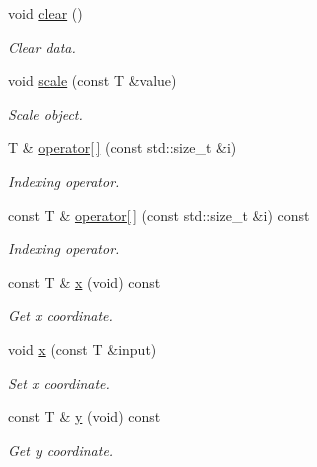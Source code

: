 \begin{DoxyCompactItemize}
void \hyperlink{classddd_1_1row_object_a1da634f01207c96a25d5d53a74619afe}{clear} ()
\begin{DoxyCompactList}\small\item\em Clear data. \end{DoxyCompactList}\item 
void \hyperlink{classddd_1_1row_object_a6c87f5fadb3b725f6c52cb08aed98eb2}{scale} (const T \&value)
\begin{DoxyCompactList}\small\item\em Scale object. \end{DoxyCompactList}\item 
T \& \hyperlink{classddd_1_1row_object_aff4fdb32f8b837e224b26de2bcecc7d2}{operator\mbox{[}$\,$\mbox{]}} (const std\+::size\+\_\+t \&i)
\begin{DoxyCompactList}\small\item\em Indexing operator. \end{DoxyCompactList}\item 
const T \& \hyperlink{classddd_1_1row_object_a60418f8af09e6913d16b48f2cb53e826}{operator\mbox{[}$\,$\mbox{]}} (const std\+::size\+\_\+t \&i) const
\begin{DoxyCompactList}\small\item\em Indexing operator. \end{DoxyCompactList}\item 
\mbox{\label{classddd_1_1row_object_a29439db5bbde399481c341cb66b7973e}} 
const T \& \hyperlink{classddd_1_1row_object_a29439db5bbde399481c341cb66b7973e}{x} (void) const
\begin{DoxyCompactList}\small\item\em Get x coordinate. \end{DoxyCompactList}\item 
void \hyperlink{classddd_1_1row_object_afe92fca2bf490cdef9b684bd3847d7eb}{x} (const T \&input)
\begin{DoxyCompactList}\small\item\em Set x coordinate. \end{DoxyCompactList}\item 
\mbox{\label{classddd_1_1row_object_adac0d72ea44ad43b82f47b7a26010e4e}} 
const T \& \hyperlink{classddd_1_1row_object_adac0d72ea44ad43b82f47b7a26010e4e}{y} (void) const
\begin{DoxyCompactList}\small\item\em Get y coordinate. \end{DoxyCompactList}\item 

\end{DoxyCompactItemize}
